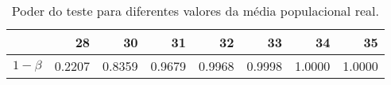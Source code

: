 \begin{table}[ht]
\centering
\caption{Poder do teste para diferentes valores da média populacional real.} 
\label{tb:1b}
\begin{tabular}{rrrrrrrr}
  \toprule
 & 28 & 30 & 31 & 32 & 33 & 34 & 35 \\ 
  \midrule
$1-\beta$ & 0.2207 & 0.8359 & 0.9679 & 0.9968 & 0.9998 & 1.0000 & 1.0000 \\ 
   \bottomrule
\end{tabular}
\end{table}

